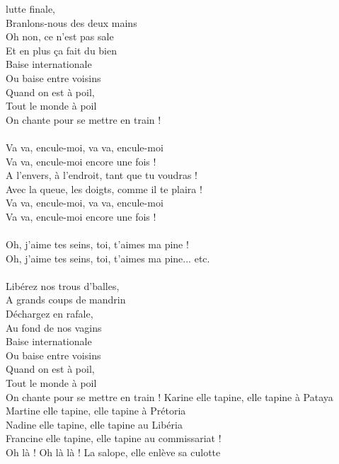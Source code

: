 
 lutte finale,
\\Branlons-nous des deux mains
\\Oh non, ce n'est pas sale
\\Et en plus ça fait du bien
\\Baise internationale
\\Ou baise entre voisins
\\Quand on est à poil,
\\Tout le monde à poil
\\On chante pour se mettre en train !
\\\\Va va, encule-moi, va va, encule-moi
\\Va va, encule-moi encore une fois ! \bissimple
\\A l'envers, à l'endroit, tant que tu voudras !
\\Avec la queue, les doigts, comme il te plaira !
\\Va va, encule-moi, va va, encule-moi
\\Va va, encule-moi encore une fois !
\\\\Oh, j'aime tes seins, toi, t'aimes ma pine !
\\Oh, j'aime tes seins, toi, t'aimes ma pine... etc.
\\\\Libérez nos trous d'balles,
\\A grands coups de mandrin
\\Déchargez en rafale,
\\Au fond de nos vagins
\\Baise internationale
\\Ou baise entre voisins
\\Quand on est à poil,
\\Tout le monde à poil
\\On chante pour se mettre en train !
\breakpage
Karine elle tapine, elle tapine à Pataya
\\Martine elle tapine, elle tapine à Prétoria
\\Nadine elle tapine, elle tapine au Libéria
\\Francine elle tapine, elle tapine au commissariat !
\\Oh là ! Oh là là ! La salope, elle enlève sa culotte
